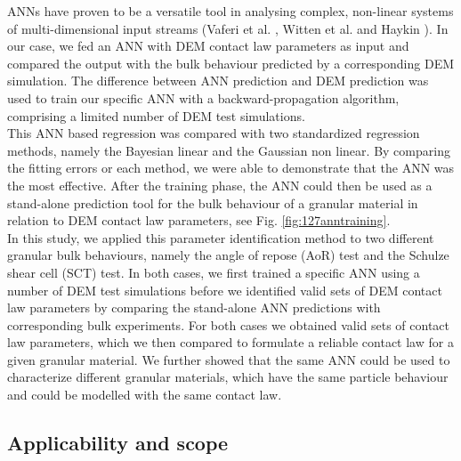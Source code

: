 \acs{ANNs} have proven to be a versatile tool in analysing complex, non-linear
systems of multi-dimensional input streams (Vaferi et al. \cite{RefWorks:150}, Witten et
al. \cite{RefWorks:174} and Haykin \cite{RefWorks:158}).
In our case, we fed an \acs{ANN} with \acs{DEM} contact law parameters as input
and compared the output with the bulk behaviour 
predicted by a corresponding \acs{DEM} simulation. 
The difference between \acs{ANN} prediction and \acs{DEM} prediction was used to
train our specific \acs{ANN} with a backward-propagation algorithm, comprising a
limited number of \acs{DEM} test simulations.\\

This \acs{ANN} based regression was compared with two standardized regression
methods, namely the Bayesian linear and the Gaussian non linear.
By comparing the fitting errors or each method, we were able to demonstrate that
the \acs{ANN} was the most effective.
After the training phase,
the \acs{ANN} could then be used as a stand-alone prediction tool for the bulk behaviour of a 
granular material in relation to \acs{DEM} contact law parameters, see Fig.
\ref{fig:127anntraining}. \\
In this study, we applied this parameter identification method to two different
granular bulk behaviours, namely the angle of repose (\acs{AoR}) test and the
Schulze shear cell (\acs{SCT}) test.
In both cases, we first trained a specific \acs{ANN} using a number of \acs{DEM} test
simulations before we identified valid sets of \acs{DEM} contact law parameters by
comparing the stand-alone \acs{ANN} predictions with corresponding bulk experiments. 
For both cases we obtained valid sets of contact law parameters, 
which we then compared to formulate a reliable contact law for a given
granular material.
We further showed that the same \acs{ANN} could be used to characterize different
granular materials, which have the same particle behaviour and could be modelled
with the same contact law.




\subsection{Applicability and scope}
\label{subsec:applicability}



